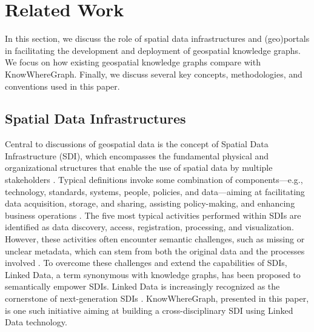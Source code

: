 \section{Related Work}
\label{sec:rel}
In this section, we discuss the role of spatial data infrastructures and (geo)portals in facilitating the development and deployment of geospatial knowledge graphs. We focus on how existing geospatial knowledge graphs compare with KnowWhereGraph. Finally, we discuss several key concepts, methodologies, and conventions used in this paper.  
\subsection{Spatial Data Infrastructures}
\label{ssec:sdi}
Central to discussions of geospatial data is the concept of Spatial Data Infrastructure (SDI), which encompasses the fundamental physical and organizational structures that enable the use of spatial data by multiple stakeholders \citep{rajabifard_role_2006}. Typical definitions invoke some combination of components---e.g., technology, standards, systems, people, policies, and data---aiming at facilitating data acquisition, storage, and sharing, assisting policy-making, and enhancing business operations \citep{hendriks_reconsidering_2012}. The five most typical activities performed within SDIs are identified as data discovery, access, registration, processing, and visualization. However, these activities often encounter semantic challenges, such as missing or unclear metadata, which can stem from both the original data and the processes involved \citep{janowicz2010semantic}. To overcome these challenges and extend the capabilities of SDIs, Linked Data, a term synonymous with knowledge graphs, has been proposed to semantically empower SDIs. Linked Data is increasingly recognized as the cornerstone of next-generation SDIs \citep{janowicz2010semantic, wiemann2016spatial, huang2019assessment, ronzhin2019next, huang2020towards}. KnowWhereGraph, presented in this paper, is one such initiative aiming at building a cross-disciplinary SDI using Linked Data technology. 

